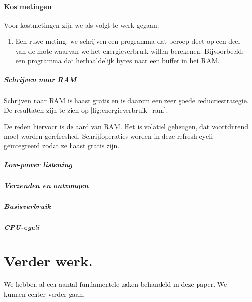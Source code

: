 \documentclass{article}
\begin{document}
\paragraph{Kostmetingen}

Voor kostmetingen zijn we als volgt te werk gegaan:

\begin{enumerate}
\item Een ruwe meting: we schrijven een programma dat beroep doet op een deel
van de mote waarvan we het energieverbruik willen berekenen. Bijvoorbeeld: een
programma dat herhaaldelijk bytes naar een buffer in het RAM. 
\end{enumerate}

\subparagraph{Schrijven naar RAM}

Schrijven naar RAM is haast gratis en is daarom een zeer goede
reductiestrategie. De resultaten zijn te zien op \ref{fig:energieverbruik_ram}.

De reden hiervoor is de aard van RAM. Het is volatiel geheugen, dat voortdurend
moet worden gerefreshed. Schrijfoperaties worden in deze refresh-cycli
ge\"integreerd zodat ze haast gratis zijn.


\subparagraph{Low-power listening}


\subparagraph{Verzenden en ontvangen}


\subparagraph{Basisverbruik}


\subparagraph{CPU-cycli}



\section{Verder werk.} 

We hebben al een aantal fundamentele zaken behandeld in deze paper. We kunnen
echter verder gaan.
 
\end{document}
